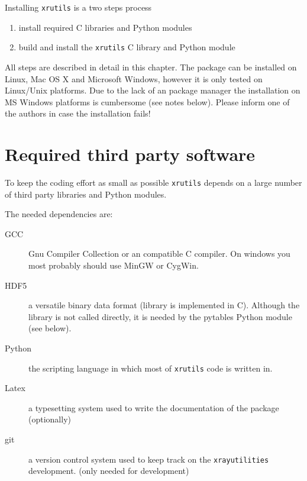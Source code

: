 %
%
%
%


Installing {\tt xrutils} is a two steps process
\begin{enumerate}
\item install required C libraries and Python modules
\item build and install the {\tt xrutils} C library and Python module
\end{enumerate}
All steps are described in detail in this chapter. The package can be installed on Linux, Mac OS X and Microsoft Windows, however it is only tested on Linux/Unix platforms. Due to the lack of an package manager the installation on MS Windows platforms is cumbersome (see notes below). Please inform one of the authors in case the installation fails!

\section{Required third party software}
To keep the coding effort as small as possible {\tt xrutils} depends on a 
large number of third party libraries and Python modules. 

The needed dependencies are: 
\begin{description}
\item[GCC] Gnu Compiler Collection or an compatible C compiler. On windows you most probably should use MinGW or CygWin.
\item[HDF5] a versatile binary data format (library is implemented in C).
Although the library is not called directly, it is needed by the pytables Python
module (see below).
\item[Python] the scripting language in which most of {\tt xrutils} code is written in.
\item[Latex] a typesetting system used to write the documentation of the package (optionally)
\item[git] a version control system used to keep track on the {\tt xrayutilities} development. (only needed for development)
\end{description}

